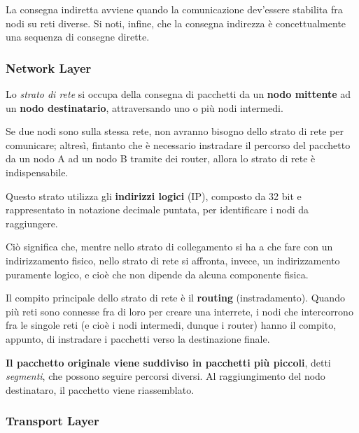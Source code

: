             La consegna indiretta avviene quando la comunicazione dev'essere stabilita fra nodi su reti diverse. Si noti, infine, che la consegna indirezza è concettualmente una sequenza di consegne dirette.
        
        \subsubsection{Network Layer}
        
            Lo \textit{strato di rete} si occupa della consegna di pacchetti da un \textbf{nodo mittente} ad un \textbf{nodo destinatario}, attraversando uno o più nodi intermedi. 
            
            Se due nodi sono sulla stessa rete, non avranno bisogno dello strato di rete per comunicare; altresì, fintanto che è necessario instradare il percorso del pacchetto da un nodo A ad un nodo B tramite dei router, allora lo strato di rete è indispensabile.
            
            \vspace{3mm}
            
            Questo strato utilizza gli \textbf{indirizzi logici} (IP), composto da 32 bit e rappresentato in notazione decimale puntata, per identificare i nodi da raggiungere. 
            
            Ciò significa che, mentre nello strato di collegamento si ha a che fare con un indirizzamento fisico, nello strato di rete si affronta, invece, un indirizzamento puramente logico, e cioè che non dipende da alcuna componente fisica.
            
            \vspace{3mm}
            
            Il compito principale dello strato di rete è il \textbf{routing} (instradamento). Quando più reti sono connesse fra di loro per creare una interrete, i nodi che intercorrono fra le singole reti (e cioè i nodi intermedi, dunque i router) hanno il compito, appunto, di instradare i pacchetti verso la destinazione finale. 
            
            \textbf{Il pacchetto originale viene suddiviso in pacchetti più piccoli}, detti \textit{segmenti}, che possono seguire percorsi diversi. Al raggiungimento del nodo destinataro, il pacchetto viene riassemblato.
        
        \subsubsection{Transport Layer}
        
